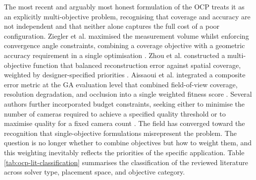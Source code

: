 The most recent and arguably most honest formulation of the \gls{OCP} treats it as an explicitly multi-objective problem, recognising that coverage and accuracy are not independent and that neither alone captures the full cost of a poor configuration. Ziegler et al. maximised the measurement volume whilst enforcing convergence angle constraints, combining a coverage objective with a geometric accuracy requirement in a single optimisation \parencite{zieglerOptimalCameraPlacement2023}. Zhou et al. constructed a multi-objective function that balanced reconstruction error against spatial coverage, weighted by designer-specified priorities \parencite{zhouSensorPlacementOptimization2024}. Aissaoui et al. integrated a composite error metric at the GA evaluation level that combined field-of-view coverage, resolution degradation, and occlusion into a single weighted fitness score \parencite{aissaouiDesigningCameraPlacement2018}. Several authors further incorporated budget constraints, seeking either to minimise the number of cameras required to achieve a specified quality threshold \parencite{kirchhofOptimalPlacementMultiple2013, daiOptimalCameraConfiguration} or to maximise quality for a fixed camera count \parencite{aissaouiDesigningCameraPlacement2018, rahimianOptimalCameraPlacement2017}. The field has converged toward the recognition that single-objective formulations misrepresent the problem. The question is no longer whether to combine objectives but how to weight them, and this weighting inevitably reflects the priorities of the specific application. Table \ref{tab:ocp-lit-classification} summarises the classification of the reviewed literature across solver type, placement space, and objective category.


